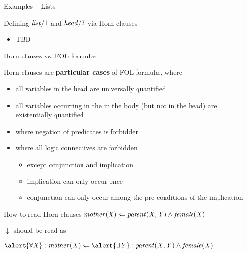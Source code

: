 \documentclass[presentation]{beamer}\mode<presentation>{\usetheme{AMSBolognaFC}}
\begin{document}
\begin{frame}{Examples -- Lists}
    \begin{exampleblock}{Defining $\mathit{list}/1$ and $\mathit{head}/2$ via Horn clauses}
        \begin{itemize}
            \item TBD
        \end{itemize}
    \end{exampleblock}
\end{frame}

\begin{frame}[allowframebreaks]{Horn clauses vs. FOL formul\ae}
    \begin{block}{Horn clauses are \textbf{particular cases} of FOL formul\ae, where}
        \begin{itemize}
            \item all variables in the head are \alert{universally} quantified
            \item all variables occurring in the in the body (but not in the head) are \alert{existentially} quantified
            \item where negation of predicates is forbidden
            \item where all logic connectives are forbidden
            \begin{itemize}
                \item except conjunction and implication
                \item implication can only occur once
                \item conjunction can only occur among the pre-conditions of the implication
            \end{itemize}
        \end{itemize}
    \end{block}

    \begin{exampleblock}{How to read Horn clauses}
        \centering
        $\mathit{mother(\mathit{X}) \Leftarrow \mathit{parent}(\mathit{X}, \mathit{Y}) \wedge \mathit{female}(\mathit{X})}$

        $\downarrow$ should be read as

        $\predication{\alert{\forall \variable{X}} : mother(\variable{X}) \Leftarrow \alert{\exists \variable{Y}} : \predication{parent}(\variable{X}, \variable{Y}) \wedge \predication{female}(\variable{X})}$
    \end{exampleblock}
\end{frame}
\end{document}
